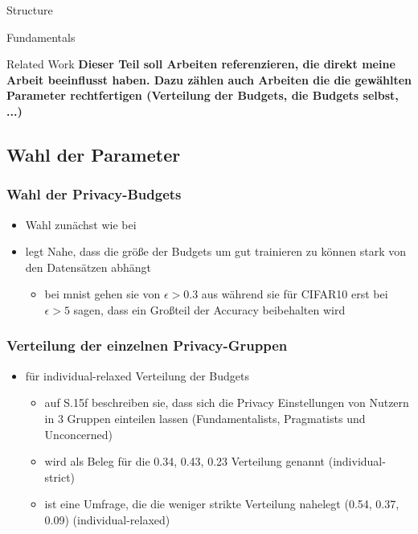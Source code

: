 \begin{chapter}{Structure}
\begin{section}{Fundamentals}
	\end{section}
	
	\begin{section}{Related Work}
		\textbf{Dieser Teil soll Arbeiten referenzieren, die direkt meine Arbeit beeinflusst haben. Dazu zählen auch Arbeiten die die gewählten Parameter rechtfertigen (Verteilung der Budgets, die Budgets selbst, ...)}
		
		\subsection{Wahl der Parameter}
		\subsubsection{Wahl der Privacy-Budgets}
		\begin{itemize}
			\item Wahl zunächst wie bei \cite{boenisch:2023}
			\item \cite{sun:2021} legt Nahe, dass die größe der Budgets um gut trainieren zu können stark von den Datensätzen abhängt
			\begin{itemize}
				\item bei mnist gehen sie von $\epsilon > 0.3$ aus während sie für CIFAR10 erst bei $\epsilon > 5$ sagen, dass ein Großteil der Accuracy beibehalten wird
			\end{itemize}
		\end{itemize}
		\subsubsection{Verteilung der einzelnen Privacy-Gruppen}
		\begin{itemize}
			\item \cite{alaggan:2016} für individual-relaxed Verteilung der Budgets
				\begin{itemize}
					\item auf S.15f beschreiben sie, dass sich die Privacy Einstellungen von Nutzern in 3 Gruppen einteilen lassen (Fundamentalists, Pragmatists und Unconcerned)
					\item \cite{jensen:2005} wird als Beleg für die 0.34, 0.43, 0.23 Verteilung genannt (individual-strict)
					\item \cite{acquisti:2005} ist eine Umfrage, die die weniger strikte Verteilung nahelegt (0.54, 0.37, 0.09) (individual-relaxed)
				\end{itemize}
		\end{itemize}
		

\end{section}
\end{chapter}
